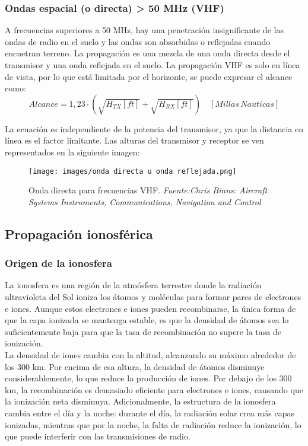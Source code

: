 \subsubsection{Ondas espacial (o directa) > 50 MHz (VHF)}
A frecuencias superiores a 50 MHz, hay una penetración insignificante de las ondas de radio en el suelo y las ondas son absorbidas o reflejadas cuando encuetran terreno. La propagación es una mezcla de una onda directa desde el transmisor y una onda reflejada en el suelo. La propagación VHF es solo en línea de vista, por lo que está limitada por el horizonte, se puede expresar el alcance como:
\begin{equation}
 Alcance = 1,23 \cdot (\sqrt{H_{TX}[ft]} + \sqrt{H_{RX}[ft]}) \quad [Millas  \, Nauticas]
 \end{equation}

La ecuación es independiente de la potencia del transmisor, ya que la distancia en línea es el factor limitante. Las alturas del transmisor y receptor se ven representados en la siguiente imagen:

\begin{figure}[H]
    \centering
    \texttt{[image: images/onda directa u onda reflejada.png]}
    \caption{\centering Onda directa para frecuencias VHF. \textit{ Fuente:Chris Binns: Aircraft Systems Instruments, Communications, Navigation and Control}}
    \label{fig:mi-imagen17}
\end{figure}

\subsection{Propagación ionosférica}

\subsubsection{Origen de la ionosfera}
La ionosfera es una región de la atmósfera terrestre donde la radiación ultravioleta del Sol ioniza los átomos y moléculas para formar pares de electrones e iones. Aunque estos electrones e iones pueden recombinarse, la única forma de que la capa ionizada se mantenga estable, es que la densidad de átomos sea lo suficientemente baja para que la tasa de recombinación no supere la tasa de ionización.\\

La densidad de iones cambia con la altitud, alcanzando su máximo alrededor de los 300 km. Por encima de esa altura, la densidad de átomos disminuye considerablemente, lo que reduce la producción de iones. Por debajo de los 300 km, la recombinación es demasiado eficiente para electrones e iones, causando que la ionización neta disminuya.  Adicionalmente, la estructura de la ionosfera cambia entre el día y la noche: durante el día, la radiación solar crea más capas ionizadas, mientras que por la noche, la falta de radiación reduce la ionización, lo que puede interferir con las transmisiones de radio.\\

